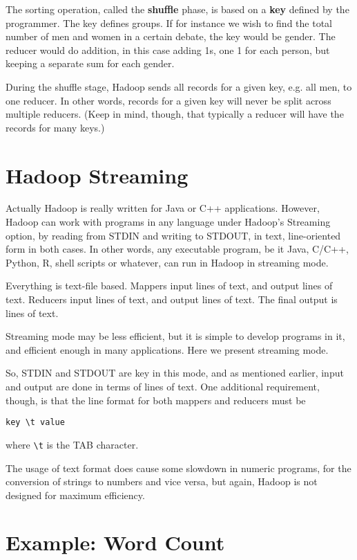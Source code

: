 The sorting operation, called the {\bf shuffle} phase, is based on a
{\bf key} defined by the programmer.  The key defines groups.  If for
instance we wish to find the total number of men and women in a certain
debate, the key would be gender.  The reducer would do addition, in this
case adding 1s, one 1 for each person, but keeping a separate sum for
each gender.

During the shuffle stage, Hadoop sends all records for a given key, e.g.
all men, to one reducer.  In other words, records for a given key will
never be split across multiple reducers.  (Keep in mind, though, that
typically a reducer will have the records for many keys.)  

\section{Hadoop Streaming}

Actually Hadoop is really written for Java or C++ applications.
However, Hadoop can work with programs in any language under Hadoop's
Streaming option, by reading from STDIN and writing to STDOUT, in text,
line-oriented form in both cases.  In other words, any executable
program, be it Java, C/C++, Python, R, shell scripts or whatever, can
run in Hadoop in streaming mode.

Everything is text-file based.  Mappers input lines of text, and output
lines of text.  Reducers input lines of text, and output lines of text.
The final output is lines of text.

Streaming mode may be less efficient, but it is simple to develop
programs in it, and efficient enough in many applications.  Here we
present streaming mode.

So, STDIN and STDOUT are key in this mode, and as mentioned earlier,
input and output are done in terms of lines of text.  One additional
requirement, though, is that the line format for both mappers and
reducers must be

\begin{lstlisting}
key \t value
\end{lstlisting}

where \lstinline{\t} is the TAB character.

The usage of text format does cause some slowdown in numeric programs,
for the conversion of strings to numbers and vice versa, but again,
Hadoop is not designed for maximum efficiency.

\section{Example:  Word Count}
\label{hadoopwordcount}

